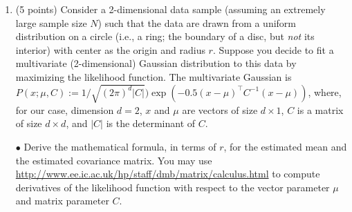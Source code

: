 \documentclass[11pt]{article}
\begin{document}
\begin {enumerate}
  (10 points) Use the Matlab function rand() to generate a data sample of $N$ points from the uniform distribution on $(0,1)$. Transform the
  resulting data $x$ to generate a transformed data sample where each datum $y := (-1 / \lambda) \log (x)$ with $\lambda = 5$. The
  transformed data $y$ will have some distribution with parameter $\lambda$; what is its analytical form~? Use a Gamma prior on the
  parameter $\lambda$, where the Gamma distribution has parameters $\alpha = 5.5$ and $\beta = 1$.
  
  Consider various sample sizes $N = $ 5, 10, 20, 40, 60, 80, 100, 500, $10^3, 10^4$.  For each sample size $N$, repeat the following
  experiment $M \ge 100$ times: generate the data, get the maximum likelihood estimate $\widehat \lambda^{\text{ML}}$, get the Bayesian
  estimate as the posterior mean $\widehat \lambda^{\text{PosteriorMean}}$, and measure the relative errors
  $| \widehat \lambda - \lambda_{\text{true}} | / \lambda_{\text{true}}$ for both the estimates.
  
  $\bullet$ Derive a formula for the posterior mean.
  
  $\bullet$ Plot a single graph that shows the relative errors for each value of $N$ as a box plot (use the Matlab boxplot() function), for both the
  estimates.
  
  $\bullet$ Interpret what you see in the graph. (i)~What happens to the error as $N$ increases~? (ii)~Which of the two estimates will you prefer and
  why~?
  
\item %
  
  (5 points) Consider a 2-dimensional data sample (assuming an extremely large sample size $N$) such that the data are drawn from a uniform
  distribution on a circle (i.e., a ring; the boundary of a disc, but {\em not} its interior) with center as the origin and radius $r$.  Suppose you
  decide to fit a multivariate (2-dimensional) Gaussian distribution to this data by maximizing the likelihood function. The multivariate Gaussian is
  $P (x; \mu, C) := 1 / \sqrt {(2 \pi)^d |C|}) \exp (- 0.5 (x - \mu)^\top C^{-1} (x - \mu))$, where, for our case, dimension $d = 2$, $x$ and $\mu$
  are vectors of size $d \times 1$, $C$ is a matrix of size $d \times d$, and $|C|$ is the determinant of $C$.
  
  $\bullet$ Derive the mathematical formula, in terms of $r$, for the estimated mean and the estimated covariance matrix. You may use
  \url{http://www.ee.ic.ac.uk/hp/staff/dmb/matrix/calculus.html} to compute derivatives of the likelihood function with respect to the vector
  parameter $\mu$ and matrix parameter $C$.
  

\end{enumerate}
\end{document}
